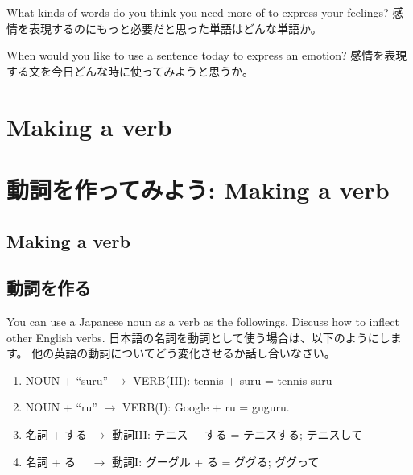 \documentclass[uplatex,dvipdfmx,b5paper,english,10pt]{jsbook}
\begin{document}
\begin{toiquestion}
\ifEnglish
What kinds of words do you think you need more of to express your feelings?
\else
感情を表現するのにもっと必要だと思った単語はどんな単語か。
\fi
\end{toiquestion}
\begin{toiquestion}
\ifEnglish
When would you like to use a sentence today to express an emotion?
\else
感情を表現する文を今日どんな時に使ってみようと思うか。
\fi
\end{toiquestion}


%

\ifEnglish
  \section{Making a verb}
\else
  \section{動詞を作ってみよう: Making a verb}
\fi


\ifEnglish
\subsection{Making a verb}
\else
\subsection{動詞を作る}
\fi

\begin{toiquestion}
\ifEnglish
You can use a Japanese noun as a verb as the followings.
Discuss how to inflect other English verbs.
\else
日本語の名詞を動詞として使う場合は、以下のようにします。
他の英語の動詞についてどう変化させるか話し合いなさい。
\fi
\end{toiquestion}

\begin{enumerate}
\ifEnglish
 \item NOUN + ``suru'' $\rightarrow$ VERB(III): tennis + suru = tennis suru
 \item NOUN + ``ru'' $\rightarrow$ VERB(I): Google + ru = guguru.
\else
 \item 名詞 + する $\rightarrow$ 動詞III: テニス + する = テニスする; テニスして
 \item 名詞 + る　 $\rightarrow$ 動詞I: グーグル + る = ググる; ググって
\fi
\end{enumerate}
\end{document}
